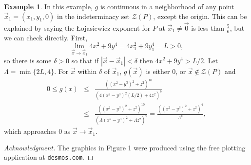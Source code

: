 \documentclass[12pt]{amsart}
\theoremstyle{definition}
\newtheorem{example}[thm]{Example}
\theoremstyle{remark}
\numberwithin{equation}{section}
\newcommand{\vv}{\mathcal{Z}}
\begin{document}
\begin{example}
  In this example, $g$ is continuous in a neighborhood of any point $\vec x_1=(x_1,y_1,0)$ in the indeterminacy set $\vv(P)$, except the origin.  This can be explained by saying the \L ojasiewicz exponent for $P$ at $\vec x_1\ne\vec0$ is less than $\frac56$, but we can check directly.  First, $$\lim_{\vec x\to\vec x_1}4x^2+9y^4=4x_1^2+9y_1^4=L>0,$$ so there is some $\delta>0$ so that if $|\vec x-\vec x_1|<\delta$ then $4x^2+9y^4>L/2$.  Let $\Lambda=\min\{2L,4\}$.  For $\vec x$ within $\delta$ of $\vec x_1$, $g(\vec x)$ is either $0$, or $\vec x\notin\vv(P)$ and 
  \begin{eqnarray*}
      0\le g(x)&\le&{\displaystyle{\frac{((x^2-y^3)^2+z^2)^{10}}{(4(x^2-y^3)^2(L/2)+4z^2)^{6}}}}\\
      &\le&{\displaystyle{\frac{((x^2-y^3)^2+z^2)^{10}}{(\Lambda(x^2-y^3)^2+\Lambda z^2)^{6}}}}={\displaystyle{\frac{((x^2-y^3)^2+z^2)^{4}}{\Lambda^{6}}}},
  \end{eqnarray*}
  which approaches $0$ as $\vec x\to\vec x_1$.
\end{example}

\begin{proof}[Acknowledgment] 
  The graphics in Figure 1 were produced using the free plotting application at {\tt desmos.com}.
\end{proof}



%
 
\end{document}
